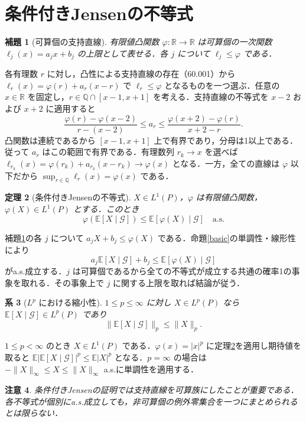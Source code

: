 \documentclass[a5paper,10pt,onecolumn]{jsarticle}
\makeatletter
\theoremstyle{mathnotetheorem}
\newtheorem{theorem}{定理}[section]
\newtheorem{lemma}[theorem]{補題}
\newtheorem{corollary}[theorem]{系}
\newtheorem{remark}[theorem]{注意}
\renewcommand{\proofname}{証明}
\renewenvironment{proof}[1][\proofname]{%
  \par\pushQED{\qed}\normalfont\topsep4\p@\@plus2\p@\relax
  \trivlist\item[\hskip\labelsep\bfseries #1]\ignorespaces
}{\popQED\endtrivlist\@endpefalse}
\newcommand{\R}{\mathbb{R}}
\newcommand{\norm}[1]{\lVert #1\rVert}
\newcommand{\G}{\mathcal G}
\newcommand{\E}{\mathbb E}
\newcommand{\1}{\mathbf{1}}
\makeatother
\begin{document}
\section{条件付きJensenの不等式}
\begin{lemma}[可算個の支持直線]\label{lines}
有限値凸関数 $\varphi:\R\to\R$ は可算個の一次関数 $\ell_j(x)=a_jx+b_j$ の上限として表せる．各 $j$ について $\ell_j\le\varphi$ である．
\end{lemma}
\begin{proof}
各有理数 $r$ に対し，凸性による支持直線の存在（60.001）から $\ell_r(x)=\varphi(r)+a_r(x-r)$ で $\ell_r\le\varphi$ となるものを一つ選ぶ．任意の $x\in\R$ を固定し，$r\in\mathbb Q\cap[x-1,x+1]$ を考える．支持直線の不等式を $x-2$ および $x+2$ に適用すると
\[
 \frac{\varphi(r)-\varphi(x-2)}{r-(x-2)}
 \le a_r\le
 \frac{\varphi(x+2)-\varphi(r)}{x+2-r}.
\]
凸関数は連続であるから $[x-1,x+1]$ 上で有界であり，分母は1以上である．従って $a_r$ はこの範囲で有界である．有理数列 $r_k\to x$ を選べば $\ell_{r_k}(x)=\varphi(r_k)+a_{r_k}(x-r_k)\to\varphi(x)$ となる．一方，全ての直線は $\varphi$ 以下だから $\sup_{r\in\mathbb Q}\ell_r(x)=\varphi(x)$ である．
\end{proof}
\begin{theorem}[条件付きJensenの不等式]\label{jensen}
$X\in L^1(P)$，$\varphi$ は有限値凸関数，$\varphi(X)\in L^1(P)$ とする．このとき
\[
 \varphi(\E[X\mid\G])\le\E[\varphi(X)\mid\G]
 \quad\text{a.s.}
\]
\end{theorem}
\begin{proof}
補題\ref{lines}の各 $j$ について $a_jX+b_j\le\varphi(X)$ である．命題\ref{basic}の単調性・線形性により
\[
 a_j\E[X\mid\G]+b_j\le\E[\varphi(X)\mid\G]
\]
がa.s.成立する．$j$ は可算個であるから全ての不等式が成立する共通の確率1の事象を取れる．その事象上で $j$ に関する上限を取れば結論が従う．
\end{proof}
\begin{corollary}[$L^p$ における縮小性]\label{contract}
$1\le p\le\infty$ に対し $X\in L^p(P)$ なら $\E[X\mid\G]\in L^p(P)$ であり
\[
 \norm{\E[X\mid\G]}_p\le\norm X_p.
\]
\end{corollary}
\begin{proof}
$1\le p<\infty$ のとき $X\in L^1(P)$ である．$\varphi(x)=|x|^p$ に定理\ref{jensen}を適用し期待値を取ると $\E|\E[X\mid\G]|^p\le\E|X|^p$ となる．$p=\infty$ の場合は $-\norm X_\infty\le X\le\norm X_\infty$ a.s.に単調性を適用する．
\end{proof}
\begin{remark}
条件付きJensenの証明では支持直線を可算族にしたことが重要である．各不等式が個別にa.s.成立しても，非可算個の例外零集合を一つにまとめられるとは限らない．
\end{remark}
\end{document}
